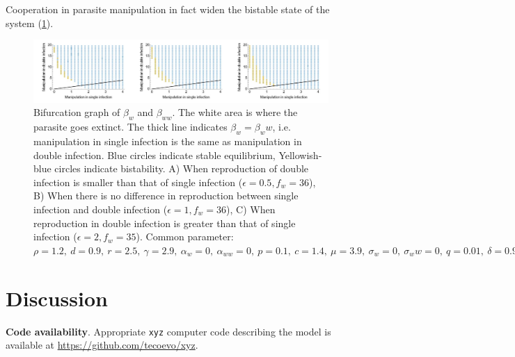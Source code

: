 \documentclass{article}
\begin{document}
Cooperation in parasite manipulation in fact widen the bistable state of the system (\ref{fig:manipbifur}). 
\begin{figure}[!ht]
\includegraphics[width=\textwidth]{Figures/manip_bifurcation.jpg}
\caption{Bifurcation graph of $\beta_w$ and $\beta_{ww}$. The white area is where the parasite goes extinct. The thick line indicates $\beta_w = \beta_ww$, i.e. manipulation in single infection is the same as manipulation in double infection. Blue circles indicate stable equilibrium, Yellowish-blue circles indicate bistability. A) When reproduction of double infection is smaller than that of single infection ($\epsilon = 0.5, f_w = 36$), B) When there is no difference in reproduction between single infection and double infection ($\epsilon = 1, f_w = 36$), C) When reproduction in double infection is greater than that of single infection ($\epsilon = 2, f_w = 35$).  Common parameter:$\rho = 1.2, \ d = 0.9, \ r = 2.5, \ \gamma = 2.9, \ \alpha_w = 0, \ \alpha_{ww} = 0, \ p = 0.1, \ c = 1.4, \ \mu = 3.9, \ \sigma_w = 0, \ \sigma_ww = 0, \ q = 0.01, \ \delta = 0.9, \ k = 0.26, \ \epsilon = 0.5$ }
\label{fig:manipbifur}
\end{figure}


\section{Discussion}

\textbf{Code availability}.
Appropriate {\tt{xyz}} computer code describing the model is available at {\url{https://github.com/tecoevo/xyz}}.







\appendix
\end{document}
